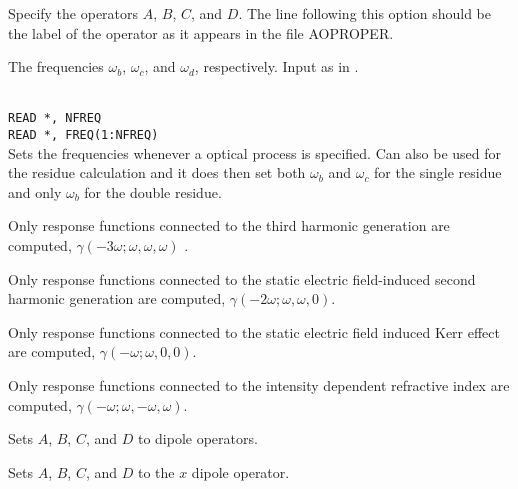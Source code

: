\begin{description}

\item[, , , ]
Specify the operators $A$, $B$, $C$, and $D$. The line following this
option should be the label of the operator as it appears in the file
AOPROPER.

\item[, , ]
The frequencies
$\omega_b$, $\omega_c$, and $\omega_d$, respectively. Input as in
.

\item{}\\
\verb|READ *, NFREQ|\\
\verb|READ *, FREQ(1:NFREQ)|\\
Sets the frequencies whenever a optical process is specified.
Can also be used for the residue calculation and it does then set 
both $\omega_b$ and $\omega_c$ for the single residue and only
$\omega_b$ for the double residue.

\item{}
Only response functions connected to the third harmonic
generation are
computed, $\gamma(-3\omega;\omega,\omega,\omega)$ \cite{djpnylhajcp105}.

\item{}
Only response functions connected to the static electric field-induced
second harmonic generation are computed,
$\gamma(-2\omega;\omega,\omega,0)$.

\item{}
Only response functions connected to the static electric field induced
Kerr effect are computed,
$\gamma(-\omega;\omega,0,0)$.

\item{}
Only response functions connected to the intensity dependent 
refractive index are computed,
$\gamma(-\omega;\omega,-\omega,\omega)$.

\item{}
Sets $A$, $B$, $C$, and $D$ to dipole operators.

\item{}
Sets $A$, $B$, $C$, and $D$ to the $x$ dipole operator.


\end{description}
